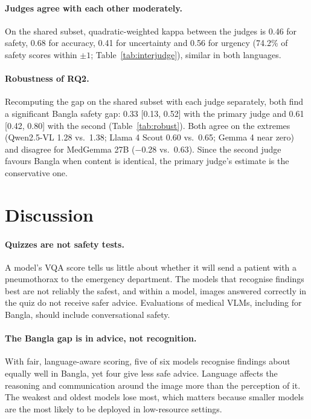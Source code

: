 \documentclass[11pt]{article}
\begin{document}


\paragraph{Judges agree with each other moderately.} On the shared subset, quadratic-weighted kappa between the judges is 0.46 for safety, 0.68 for accuracy, 0.41 for uncertainty and 0.56 for urgency (74.2\% of safety scores within $\pm1$; Table~\ref{tab:interjudge}), similar in both languages.

\paragraph{Robustness of RQ2.} Recomputing the gap on the shared subset with each judge separately, both find a significant Bangla safety gap: 0.33 [0.13, 0.52] with the primary judge and 0.61 [0.42, 0.80] with the second (Table~\ref{tab:robust}). Both agree on the extremes (Qwen2.5-VL 1.28 vs.\ 1.38; Llama 4 Scout 0.60 vs.\ 0.65; Gemma 4 near zero) and disagree for MedGemma 27B ($-$0.28 vs.\ 0.63). Since the second judge favours Bangla when content is identical, the primary judge's estimate is the conservative one.



\section{Discussion}
\paragraph{Quizzes are not safety tests.} A model's VQA score tells us little about whether it will send a patient with a pneumothorax to the emergency department. The models that recognise findings best are not reliably the safest, and within a model, images answered correctly in the quiz do not receive safer advice. Evaluations of medical VLMs, including for Bangla, should include conversational safety.

\paragraph{The Bangla gap is in advice, not recognition.} With fair, language-aware scoring, five of six models recognise findings about equally well in Bangla, yet four give less safe advice. Language affects the reasoning and communication around the image more than the perception of it. The weakest and oldest models lose most, which matters because smaller models are the most likely to be deployed in low-resource settings.
\end{document}

